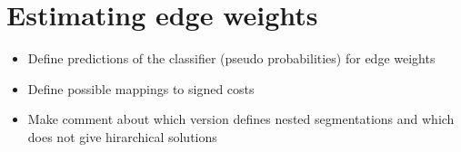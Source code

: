 
\section{Estimating edge weights}
\begin{itemize}
\item Define predictions of the classifier (pseudo probabilities) for edge weights
\item Define possible mappings to signed costs
\item Make comment about which version defines nested segmentations and which does not give hirarchical solutions

\end{itemize}
